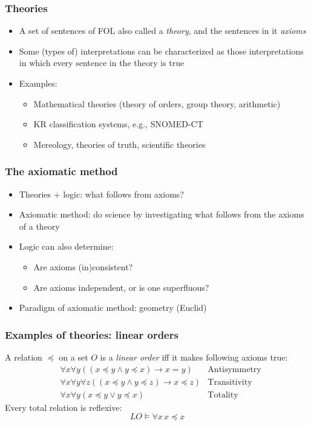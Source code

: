 \begin{frame}
    \frametitle{Theories}

\begin{itemize}
\item A set of sentences of FOL also called a \emph{theory}, and the sentences in it \emph{axioms}
\item Some (types of) interpretations can be characterized
as those interpretations in which every sentence in the theory is true
\item Examples:
\begin{itemize}
\item Mathematical theories (theory of orders, group theory, arithmetic)
\item KR classification systems, e.g., SNOMED-CT
\item Mereology, theories of truth, scientific theories
\end{itemize}
\end{itemize}
\end{frame}

\begin{frame}
    \frametitle{The axiomatic method}

\begin{itemize}
\item Theories + logic: what follows from axioms?
\item Axiomatic method: do science by investigating what follows from
  the axioms of a theory
\item Logic can also determine:
\begin{itemize}
\item Are axioms (in)consistent?
\item Are axioms independent, or is one superfluous?
\end{itemize}
\item Paradigm of axiomatic method: geometry (Euclid)
\end{itemize}
\end{frame}

\begin{frame}
    \frametitle{Examples of theories: linear orders}

A relation $\preceq$ on a set $O$ is a \emph{linear order} iff
it makes following axioms true:
\begin{align*}
& \forall x\forall y((x \preceq y \land y \preceq x) \to x = y) & \text{Antisymmetry}\\
& \forall x\forall y\forall z((x \preceq y \land y \preceq z) \to x \preceq z) &\text{Transitivity}\\
& \forall x\forall y(x \preceq y \lor y \preceq x) & \text{Totality}
\end{align*}
Every total relation is reflexive:
\[
{ LO} \models \forall x\, x \preceq x
\]
\end{frame}

